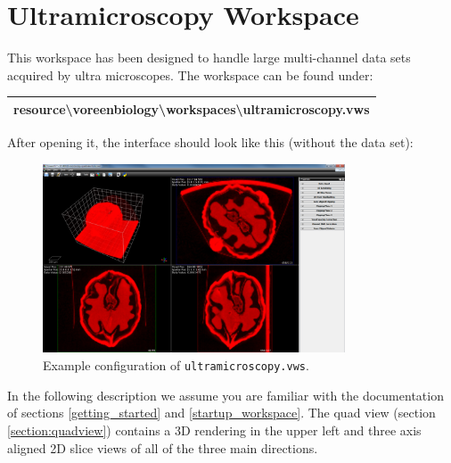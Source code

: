 \section{Ultramicroscopy Workspace} \label{ultramicroscopy_workspace}
This workspace has been designed to handle large multi-channel data sets acquired by ultra microscopes. The workspace can be found under:\\
\begin{center}
\begin{tabular}{|c|} \hline
resource\textbackslash voreenbiology\textbackslash workspaces\textbackslash ultramicroscopy.vws \\ \hline 
\end{tabular}
\end{center}
After opening it, the interface should look like this (without the data set):

\begin{figure}[h]
\centering
\includegraphics[width=0.8\textwidth]{images/workspace.png}
\cprotect\caption{Example configuration of \verb|ultramicroscopy.vws|.}
\label{ultramicroscopy.figure.workspace}
\end{figure}

In the following description we assume you are familiar with the documentation of sections \ref{getting_started} and \ref{startup_workspace}. The quad view (section \ref{section:quadview}) 
contains a 3D rendering in the upper left and three axis aligned 2D slice views of all of the three main directions.  

